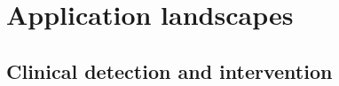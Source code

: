 \documentclass[12pt,a4paper]{article}
\begin{document}



\section{Application landscapes}
\label{sec:application_landscapes}

%


\subsection{Clinical detection and intervention}
\label{subsec:clinical_detection_intervention}

%
%
%
%
%
\end{document}
